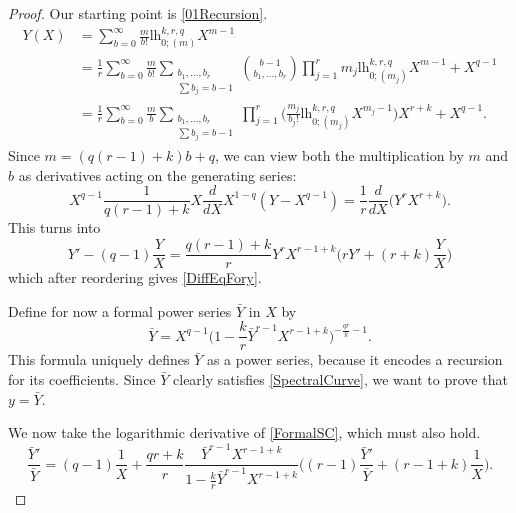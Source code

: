 \documentclass[10pt,a4paper,oneside,no-math,reqno]{amsart}%
\theoremstyle{plain}
\theoremstyle{definition}
\theoremstyle{remark}
\numberwithin{equation}{section}
\newcommand{\1}{\mathds{1}}
\newcommand{\<}{\langle}
\renewcommand{\>}{\rangle}
\newcommand{\lh}{\mathord{\mathrm{l\!h}}}
\begin{document}
\begin{proof}
	Our starting point is \cref{01Recursion}.
	\begin{equation}
		\begin{split}
			Y(X) 
		      &
		      =
		      \sum_{b=0}^\infty \frac{m}{b!} \lh^{k,r,q}_{0;(m)} X^{m-1}
		      \\
		      &
		      =
    		\frac{1}{r} \sum_{b=0}^\infty \frac{m}{b!} \sum_{\substack{b_1, \dotsc, b_{r} \\ \sum b_j = b - 1}} \binom{b - 1}{b_1, \dotsc, b_{r}} \prod_{j=1}^{r} m_j \lh^{k,r,q}_{0;(m_j)} X^{m-1} + X^{q-1}
		      \\
		      &
		      =
		      \frac{1}{r} \sum_{b=0}^\infty \frac{m}{b} \sum_{\substack{b_1, \dotsc, b_{r} \\ \sum b_j = b - 1}}  \prod_{j=1}^{r} \Big( \frac{m_j}{b_j!} \lh^{k,r,q}_{0;(m_j)} X^{m_j-1} \Big) X^{r+k} + X^{q-1} .
		\end{split}
	\end{equation}
	Since $ m = (q(r-1)+k)b+q$, we can view both the multiplication by $m $ and $b$ as derivatives acting on the generating series:
	\begin{equation}
		X^{q-1} \frac{1}{q(r-1)+k} X \frac{d}{dX} X^{1-q} (Y - X^{q-1})  = \frac{1}{r} \frac{d}{dX} \Big( Y^{r} X^{r+k}\Big).
	\end{equation}
	This turns into
	\begin{equation}
		Y' - (q-1) \frac{Y}{X}
		=
		\frac{q(r-1)+k}{r} Y^{r} X^{r-1+k} \Big(r Y' + (r+k) \frac{Y}{X} \Big)
	\end{equation}
	which after reordering gives \cref{DiffEqFory}.\par
	Define for now a formal power series $\bar{Y}$ in $ X$ by
	\begin{equation}\label{FormalSC}
		\bar{Y} = X^{q-1}\big( 1 - \frac{k}{r} \bar{Y}^{r-1} X^{r-1+k} \big)^{- \frac{qr}{k} - 1}  .
	\end{equation}
	This formula uniquely defines $\bar{Y}$ as a power series, because it encodes a recursion for its coefficients. Since $\bar{Y}$ clearly satisfies \eqref{SpectralCurve}, we want to prove that $ y = \bar{Y}$.\par
	We now take the logarithmic derivative of \eqref{FormalSC}, which must also hold.
	\begin{equation}\label{DerivativeSC}
		\frac{\bar{Y}'}{\bar{Y}} 
        =
        (q-1) \frac{1}{X} + \frac{qr+k}{r} \frac{\bar{Y}^{r-1} X^{r-1+k} }{ 1 - \frac{k}{r} \bar{Y}^{r-1} X^{r-1+k} } \Big( (r-1) \frac{\bar{Y}'}{\bar{Y}} + (r-1+k) \frac{1}{X} \Big).

\end{equation}
\end{proof}
\end{document}
